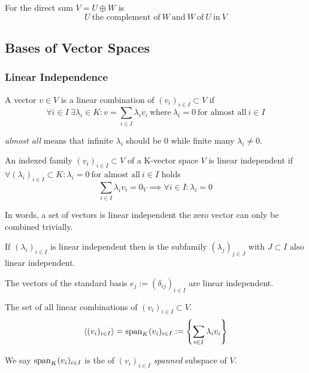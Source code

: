 \begin{definition}\label{def:complement}
   For the direct sum \(V = U \oplus W\) is
   \[U~\text{the complement of}~W~\text{and}~W~\text{of}~U~\text{in}~V\]
\end{definition}

\subsection{Bases of Vector Spaces}
\subsubsection{Linear Independence}
\begin{definition}\label{def:lin_comb}
   A vector \(v \in V\) is a linear combination of \((v_i)_{i \in I} \subset V\) if
   \[\forall i \in I~\exists \lambda_i \in K: v = \sum_{i \in I} \lambda_i v_i~\text{where}~\lambda_i = 0~\text{for almost all}~i \in I\]
\end{definition}
\begin{remark}
   \textit{almost all} means that infinite \(\lambda_i\) should be 0 while finite many \(\lambda_i \neq 0\).
\end{remark}

\begin{definition}\label{def:lin_depend}
   An indexed family \((v_i)_{i \in I} \subset V\) of a K-vector space \(V\) is linear independent if \(\forall (\lambda_i)_{i \in I} \subset K: \lambda_i = 0~\text{for almost all}~i \in I\) holds
   \[\sum_{i \in I} \lambda_i v_i = 0_V \implies \forall i \in I: \lambda_i = 0\]
\end{definition}
\begin{remark}
   In words, a set of vectors is linear independent the zero vector can only be combined trivially.

   If \((\lambda_i)_{i \in I}\) is linear independent then is the subfamily \((\lambda_j)_{j \in J}\) with \(J \subset I\) also linear independent.
\end{remark}
\begin{example}
   The vectors of the standard basis \(e_j := (\delta_{ij})_{i \in I}\) are linear independent.
\end{example}

\begin{definition}[Span]
   The set of all linear combinations of \((v_i)_{i \in I} \subset V\).
   \[\langle (v_i)_{i \in I} \rangle = \operatorname{span}_{K}(v_i)_{i \in I} := \left\{\sum_{i \in I} \lambda_i v_i \right\}\]
\end{definition}
\begin{remark}
   We say \(\operatorname{span}_{K}(v_i)_{i \in I}\) is the of \((v_i)_{i \in I}\) \textit{spanned} subspace of \(V\).
\end{remark}

